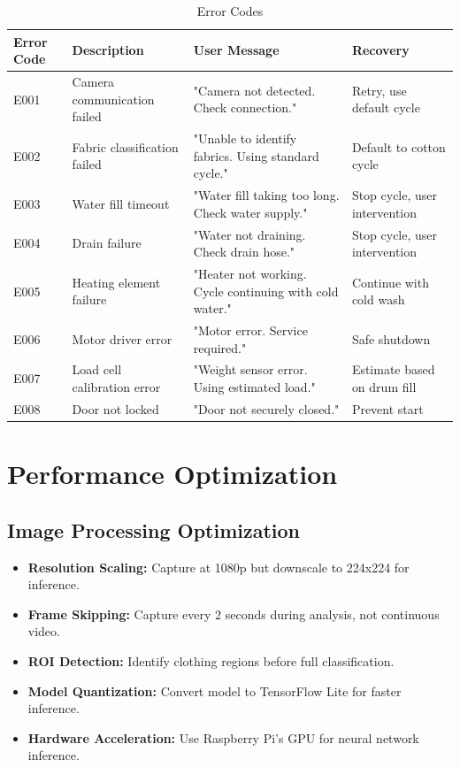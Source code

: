 \begin{table}[H]
\centering
\caption{Error Codes}
\label{tab:errors}
\small
\begin{tabular}{|l|l|p{4.5cm}|p{4cm}|}
\hline
\textbf{Error Code} & \textbf{Description} & \textbf{User Message} & \textbf{Recovery} \\
\hline
E001 & Camera communication failed & "Camera not detected. Check connection." & Retry, use default cycle \\
\hline
E002 & Fabric classification failed & "Unable to identify fabrics. Using standard cycle." & Default to cotton cycle \\
\hline
E003 & Water fill timeout & "Water fill taking too long. Check water supply." & Stop cycle, user intervention \\
\hline
E004 & Drain failure & "Water not draining. Check drain hose." & Stop cycle, user intervention \\
\hline
E005 & Heating element failure & "Heater not working. Cycle continuing with cold water." & Continue with cold wash \\
\hline
E006 & Motor driver error & "Motor error. Service required." & Safe shutdown \\
\hline
E007 & Load cell calibration error & "Weight sensor error. Using estimated load." & Estimate based on drum fill \\
\hline
E008 & Door not locked & "Door not securely closed." & Prevent start \\
\hline
\end{tabular}
\end{table}

\section{Performance Optimization}

\subsection{Image Processing Optimization}
\begin{itemize}
    \item \textbf{Resolution Scaling:} Capture at 1080p but downscale to 224x224 for inference.
    \item \textbf{Frame Skipping:} Capture every 2 seconds during analysis, not continuous video.
    \item \textbf{ROI Detection:} Identify clothing regions before full classification.
    \item \textbf{Model Quantization:} Convert model to TensorFlow Lite for faster inference.
    \item \textbf{Hardware Acceleration:} Use Raspberry Pi's GPU for neural network inference.
\end{itemize}

